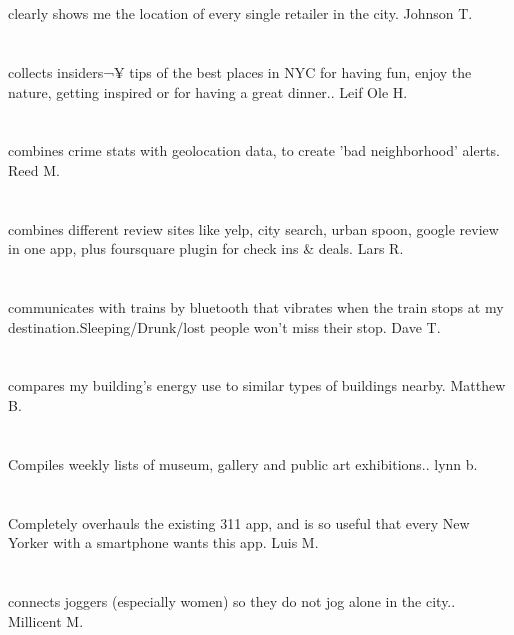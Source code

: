\section{}clearly shows me the location of every single retailer in the city. Johnson T.
\section{} collects insiders¬¥ tips of the best places in NYC for having fun,  enjoy the nature,  getting inspired or for having a great dinner.. Leif Ole H.
\section{}combines crime stats with geolocation data,  to create 'bad neighborhood' alerts. Reed M.
\section{}combines different review sites like yelp,  city search,  urban spoon,  google review in one app,  plus foursquare plugin for check ins \& deals. Lars R.
\section{}communicates with trains by bluetooth that vibrates when the train stops at my destination.Sleeping/Drunk/lost people won't miss their stop. Dave T.
\section{}compares my building's energy use to similar types of buildings nearby. Matthew B.
\section{}Compiles weekly  lists of museum,  gallery and public art exhibitions.. lynn b.
\section{} Completely overhauls the existing 311 app,  and is so useful that every New Yorker with a smartphone wants this app. Luis M.
\section{} connects joggers (especially women) so they do not jog alone in the city.. Millicent M.
